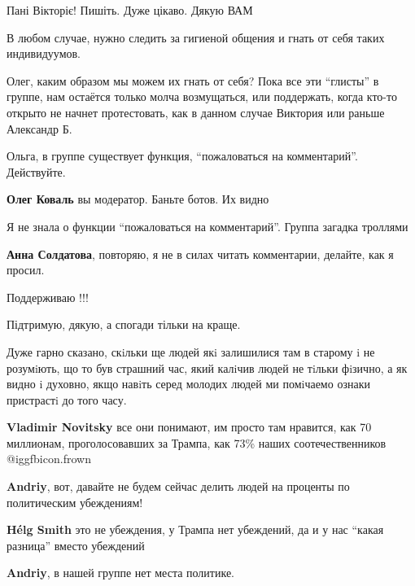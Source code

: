 \begin{itemize}
\begin{itemize}
\end{itemize} %

Пані Вікторіє! Пишіть. Дуже цікаво. Дякую ВАМ


В любом случае, нужно следить за гигиеной общения и гнать от себя таких индивидуумов.

\begin{itemize} %

Олег, каким образом мы можем их гнать от себя? Пока все эти \enquote{глисты} в группе,
нам остаётся только молча возмущаться, или поддержать, когда кто-то открыто не
начнет протестовать, как в данном случае Виктория или раньше Александр Б.


Ольга, в группе существует функция, \enquote{пожаловаться на комментарий}. Действуйте.

\textbf{Олег Коваль} вы модератор. Баньте ботов. Их видно

Я не знала о функции \enquote{пожаловаться на комментарий}. Группа загадка троллями

\textbf{Анна Солдатова}, повторяю, я не в силах читать комментарии, делайте, как я просил.
\end{itemize} %

Поддерживаю !!!

Підтримую, дякую, а спогади тільки на краще.


Дуже гарно сказано, скiльки ще людей якi залишилися там в старому i не
розумiють, що то був страшний час, який калiчив людей не тiльки фiзично, а як
видно i духовно, якщо навiть серед молодих людей ми помiчаемо ознаки пристрастi
до того часу.

\begin{itemize} %
\textbf{Vladimir Novitsky} все они понимают, им просто там нравится, как 70 миллионам, проголосовавших за Трампа, как 73\% наших соотечественников  @igg{fbicon.frown} 

\textbf{Andriy}, вот, давайте не будем сейчас делить людей на проценты по политическим убеждениям!

\textbf{Hélg Smith} это не убеждения, у Трампа нет убеждений, да и у нас
\enquote{какая разница} вместо убеждений

\textbf{Andriy}, в нашей группе нет места политике.


\end{itemize}
\end{itemize}
